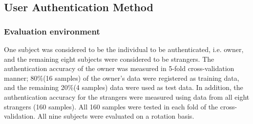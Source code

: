 \documentclass[sigchi,authordraft]{acmart}
\begin{document}



\subsection{User Authentication Method}
\subsubsection{Evaluation environment}
One subject was considered to be the individual to be authenticated, i.e. owner, and the remaining eight subjects were considered to be strangers. The authentication accuracy of the owner was measured in 5-fold cross-validation manner; 80\%(16 samples) of the owner's data were registered as training data, and the remaining 20\%(4 samples) data were used as test data. In addition, the authentication accuracy for the strangers were measured using data from all eight strangers (160 samples). All 160 samples were tested in each fold of the cross-validation. All nine subjects were evaluated on a rotation basis.\par

\end{document}
